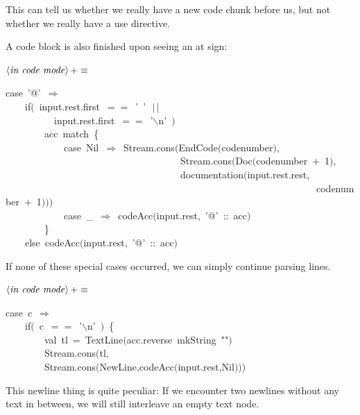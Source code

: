 \documentclass[a4paper,12pt]{article}
\begin{document}
This can tell us whether we really have a new code chunk before us,
but not whether we really have a use directive.

A code block is also finished upon seeing an at sign:

$\left<\mbox{\emph{in code mode}}\right>+\equiv$
\begin{program}{\vem case}~'@'~$\Rightarrow$
\\~~~~{\vem if}$($~input.rest.first~$==$~'~'~$\,|$$\,|$
\\~~~~~~~~~~input.rest.first~$==$~'$\backslash$n'~$)$
\\~~~~~~~~acc~{\vem match}~{\small\{}
\\~~~~~~~~~~~~{\vem case}~Nil~$\Rightarrow$~Stream.cons$($EndCode$($codenumber$)$,
\\~~~~~~~~~~~~~~~~~~~~~~~~~~~~~~~~~~~~Stream.cons$($Doc$($codenumber~$+$~1$)$,
\\~~~~~~~~~~~~~~~~~~~~~~~~~~~~~~~~~~~~documentation$($input.rest.rest,
\\~~~~~~~~~~~~~~~~~~~~~~~~~~~~~~~~~~~~~~~~~~~~~~~~~~~~~~~~~~~~~~~~codenumber~$+$~1$)$$)$$)$
\\~~~~~~~~~~~~{\vem case}~\_~$\Rightarrow$~codeAcc$($input.rest,~'@'~{\rm :}{\rm :}~acc$)$
\\~~~~~~~~{\small\}}
\\~~~~{\vem else}~codeAcc$($input.rest,~'@'~{\rm :}{\rm :}~acc$)$
\\[0.5em]\end{program}


If none of these special cases occurred, we can simply continue parsing
lines.

$\left<\mbox{\emph{in code mode}}\right>+\equiv$
\begin{program}{\vem case}~c~$\Rightarrow$
\\~~~~{\vem if}$($~c~$==$~'$\backslash$n'~$)$~{\small\{}
\\~~~~~~~~{\vem val}~tl~=~TextLine$($acc.reverse~mkString~""$)$
\\~~~~~~~~Stream.cons$($tl,
\\~~~~~~~~Stream.cons$($NewLine,codeAcc$($input.rest,Nil$)$$)$$)$
\\[0.5em]\end{program}


This newline thing is quite peculiar: If we encounter two newlines
without any text in between, we will still interleave an empty text node.
\end{document}
